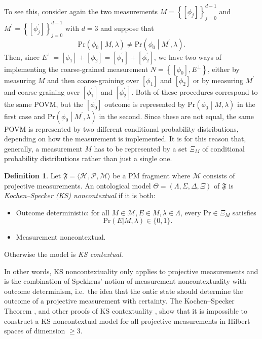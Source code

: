 \documentclass[DIV=calc,fontsize=12pt]{scrartcl} %
\theoremstyle{definition}
\newtheorem{definition}{Definition}[section]
\theoremstyle{plain}
\newcommand{\Proj}[1]{\ensuremath{\left [ #1 \right ]}}
\newcommand{\Hilb}[1][]{\ensuremath{\mathcal{H}_{#1}}}
\begin{document}
To see this, consider again the two measurements $M = \left \{
\Proj{\phi_j} \right\}_{j=0}^{d-1}$ and $M^{\prime} = \left \{
\Proj{\phi_j^{\prime}} \right \}_{j=0}^{d-1}$ with $d=3$ and suppose
that
\begin{equation}
\text{Pr} \left ( \phi_0 \middle | M,\lambda \right ) \neq
\text{Pr} \left ( \phi_0 \middle | M^{\prime},\lambda \right ).
\end{equation}
Then, since $E^{\perp} = \Proj{\phi_1} + \Proj{\phi_2} =
\Proj{\phi^{\prime}_1} + \Proj{\phi^{\prime}_2}$, we have two ways of
implementing the coarse-grained measurement $N = \left \{
\Proj{\phi_0}, E^{\perp} \right \}$, either by measuring $M$ and
then coarse-graining over $\Proj{\phi_1}$ and $\Proj{\phi_2}$ or by
measuring $M^{\prime}$ and coarse-graining over
$\Proj{\phi_1^{\prime}}$ and $\Proj{\phi_2^{\prime}}$.  Both of these
procedures correspond to the same POVM, but the $\Proj{\phi_0}$
outcome is represented by $\text{Pr} \left ( \phi_0 \middle |
M,\lambda \right )$ in the first case and $\text{Pr} \left ( \phi_0
\middle | M^{\prime},\lambda \right )$ in the second.  Since these
are not equal, the same POVM is represented by two different
conditional probability distributions, depending on how the
measurement is implemented.  It is for this reason that, generally, a
measurement $M$ has to be represented by a set $\Xi_M$ of conditional
probability distributions rather than just a single one.

\begin{definition}
Let $\mathfrak{F} = \langle \Hilb, \mathcal{P}, \mathcal{M} \rangle$
be a PM fragment where $\mathcal{M}$ consists of projective
measurements.  An ontological model $\Theta = (\Lambda, \Sigma, \Delta,
\Xi)$ of $\mathfrak{F}$ is \emph{Kochen--Specker (KS) noncontextual}
if it is both:
\begin{itemize}
\item Outcome deterministic: for all $M \in \mathcal{M}, E \in M,
\lambda \in \Lambda$, every $\text{Pr} \in \Xi_M$ satisfies
\begin{equation}
\text{Pr}(E|M,\lambda) \in \{0,1\}.
\end{equation}
\item Measurement noncontextual.
\end{itemize}
Otherwise the model is \emph{KS contextual}.
\end{definition}

In other words, KS noncontextuality only applies to projective
measurements and is the combination of Spekkens' notion of measurement
noncontextuality with outcome determinism, i.e.\ the idea that the
ontic state should determine the outcome of a projective measurement
with certainty.  The Kochen--Specker Theorem \cite{Kochen1967}, and
other proofs of KS contextuality \cite{Mermin1990, Peres1991,
Clifton1993, Cabello1996, Klyachko2008, Cabello2010, Liang2011,
Cabello2014}, show that it is impossible to construct a KS
noncontextual model for all projective measurements in Hilbert spaces
of dimension $\geq 3$.
\end{document}
